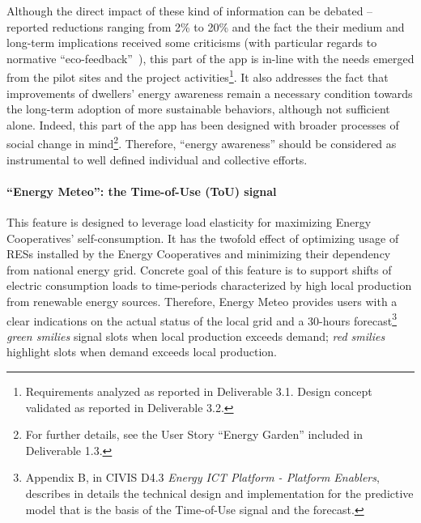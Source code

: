 Although the direct impact of these kind of information can be debated -- reported reductions ranging from 2\% to 20\% \citep{eea_report} and the fact the their medium and
long-term implications received some criticisms (with particular regards to normative ``eco-feedback''~\citep{Strengers2012,Cakici2014}), this part of the app is in-line with the needs emerged from
the pilot sites and the project activities\footnote{Requirements analyzed as reported in Deliverable 3.1. Design concept validated as reported in Deliverable 3.2.}.
It also addresses the fact that improvements of dwellers' energy awareness remain a necessary condition towards the long-term adoption of more sustainable behaviors,
although not sufficient alone. Indeed, this part of the app has been designed with broader processes of social change
in mind\footnote{For further details, see the User Story ``Energy Garden'' included in Deliverable 1.3.}. Therefore, ``energy awareness'' should be considered as instrumental to
well defined individual and collective efforts. 


\paragraph{``Energy Meteo'': the Time-of-Use (ToU) signal} 

This feature is designed to leverage load elasticity for maximizing Energy Cooperatives' self-consumption.
It has the twofold effect of optimizing usage of RESs installed by the Energy Cooperatives and minimizing their dependency from national energy grid.
Concrete goal of this feature is to support shifts of electric consumption loads to time-periods characterized by high local production from renewable energy sources.
Therefore, Energy Meteo provides users with a clear indications on the actual status of the local grid and a 30-hours forecast\footnote{Appendix B, in CIVIS D4.3 \textit{Energy ICT Platform - Platform Enablers}, describes in details the technical design and implementation for the predictive model
that is the basis of the Time-of-Use signal and the forecast.} \textit{green smilies} signal slots when local production exceeds demand; \textit{red smilies} highlight slots when demand exceeds local production.

